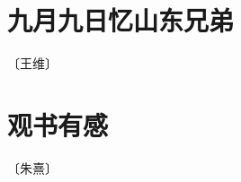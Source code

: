 \documentclass[12pt,UTF-8,openany]{ctexbook}
\begin{document}
\vspace{8pt}


\section{九月九日忆山东兄弟}

\begin{center}
    \vspace{10pt}
    
    \begin{normalsize}
        
        〔王维〕
        
    \end{normalsize}
    
    \vspace{8pt}
    
    \begin{large}
        
        
        
    \end{large}
    
\end{center}

\vspace{8pt}


\section{观书有感}

\begin{center}
    \vspace{10pt}
    
    \begin{normalsize}
        
        〔朱熹〕
        
    \end{normalsize}
    
    \vspace{8pt}
    
    \begin{large}
        
        
        
    \end{large}
    
\end{center}
\end{document}
